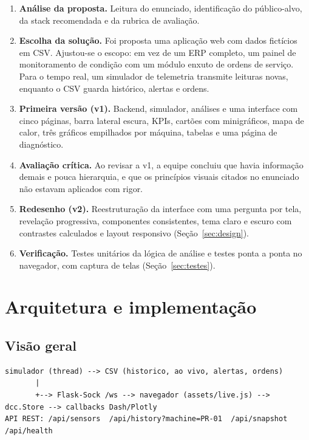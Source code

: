 \documentclass[12pt,a4paper]{article}
\begin{document}
\begin{enumerate}
  \item \textbf{Análise da proposta.} Leitura do enunciado, identificação do público-alvo, da stack recomendada e da rubrica de avaliação.
  \item \textbf{Escolha da solução.} Foi proposta uma aplicação web com dados fictícios em CSV. Ajustou-se o escopo: em vez de um ERP completo,
  um painel de monitoramento de condição com um módulo enxuto de ordens de serviço. Para o tempo real, um simulador de telemetria transmite leituras
  novas, enquanto o CSV guarda histórico, alertas e ordens.
  \item \textbf{Primeira versão (v1).} Backend, simulador, análises e uma interface com cinco páginas, barra lateral escura, KPIs, cartões com minigráficos,
  mapa de calor, três gráficos empilhados por máquina, tabelas e uma página de diagnóstico.
  \item \textbf{Avaliação crítica.} Ao revisar a v1, a equipe concluiu que havia informação demais e pouca hierarquia, e que os princípios visuais citados no
  enunciado não estavam aplicados com rigor.
  \item \textbf{Redesenho (v2).} Reestruturação da interface com uma pergunta por tela, revelação progressiva, componentes consistentes, tema claro e escuro
  com contrastes calculados e layout responsivo (Seção~\ref{sec:design}).
  \item \textbf{Verificação.} Testes unitários da lógica de análise e testes ponta a ponta no navegador, com captura de telas (Seção~\ref{sec:testes}).
\end{enumerate}

\section{Arquitetura e implementação}
\subsection{Visão geral}
\begin{lstlisting}
simulador (thread) --> CSV (historico, ao vivo, alertas, ordens)
       |
       +--> Flask-Sock /ws --> navegador (assets/live.js) --> dcc.Store --> callbacks Dash/Plotly
API REST: /api/sensors  /api/history?machine=PR-01  /api/snapshot  /api/health
\end{lstlisting}
\end{document}
